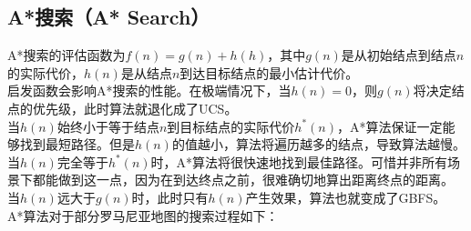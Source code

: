 \vspace{0.5cm}

\subsection{A*搜索（A* Search）}

A*搜索的评估函数为$ f(n) = g(n) + h(h) $，其中$ g(n) $是从初始结点到结点$ n $的实际代价，$ h(n) $是从结点$ n $到达目标结点的最小估计代价。\\

启发函数会影响A*搜索的性能。在极端情况下，当$ h(n) = 0 $，则$ g(n) $将决定结点的优先级，此时算法就退化成了UCS。\\

当$ h(n) $始终小于等于结点$ n $到目标结点的实际代价$ h^*(n) $，A*算法保证一定能够找到最短路径。但是$ h(n) $的值越小，算法将遍历越多的结点，导致算法越慢。\\

当$ h(n) $完全等于$ h^*(n) $时，A*算法将很快速地找到最佳路径。可惜并非所有场景下都能做到这一点，因为在到达终点之前，很难确切地算出距离终点的距离。\\

当$ h(n) $远大于$ g(n) $时，此时只有$ h(n) $产生效果，算法也就变成了GBFS。\\

A*算法对于部分罗马尼亚地图的搜索过程如下：

